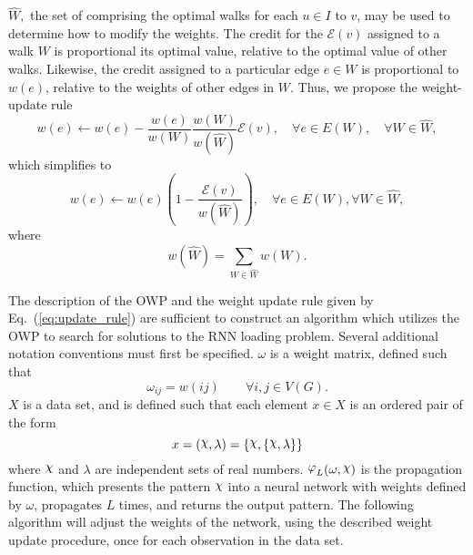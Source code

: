 \documentclass[journal]{IEEEtran}
\DeclareRobustCommand{\rchi}{{\mathpalette\irchi\relax}}
\newcommand{\irchi}[2]{\raisebox{\depth}{$#1\chi$}}
\DeclareRobustCommand{\rvarphi}{{\mathpalette\irvarphi\relax}}
\newcommand{\irvarphi}[2]{\raisebox{\depth}{$#1\varphi$}}
\begin{document}
$\hat{W},$ the set of comprising the optimal walks for each $u\in I$ to $v$, may be used to determine how to modify the weights. The credit for the $\mathcal{E}(v)$ assigned to a walk $W$ is proportional its optimal value, relative to the optimal value of other walks. Likewise, the credit assigned to a particular edge $e\in W$ is proportional to $w(e)$, relative to the weights of other edges in $W.$  Thus, we propose the weight-update rule
\begin{equation*}
w(e) \gets w(e) - \frac{w(e)}{w(W)}\frac{w(W)}{w(\hat{W})}\mathcal{E}(v), \quad \forall e\in E(W), \quad \forall W \in \hat{W},
\end{equation*}
\noindent which simplifies to 
\begin{equation}
w(e) \gets w(e) \left(1 - \frac{\mathcal{E}(v)}{w(\hat{W})}\right), \quad \forall e\in E(W), \forall W \in \hat{W},
\label{eq:update_rule}
\end{equation}
where
\begin{equation}
w(\hat{W}) = \sum_{W\in \hat{W}}w(W).
\label{eq:walk_set_value}
\end{equation}


The description of the OWP and the weight update rule given by Eq.~(\ref{eq:update_rule}) are sufficient to construct an algorithm which utilizes the OWP to search for solutions to the RNN loading problem. Several additional notation conventions must first be specified. $\omega$ is a weight matrix, defined such that
\begin{equation}
\omega_{ij}=w({ij}) \quad\quad \forall i,j \in V(G)\label{eq:weight_matrix}.
\end{equation}
\noindent $X$ is a data set, and is defined such that each element $x\in X$ is an ordered pair of the form 
\begin{equation*} \label{eq:data_ordered_pairs}
x=(\rchi, \lambda)=\{\rchi, \{ \rchi, \lambda \}\}
\end{equation*}
\noindent where $\rchi$ and $\lambda$ are independent sets of real numbers. $\rvarphi_L(\omega, \rchi)$ is the propagation function, which presents the pattern $\rchi$ into a neural network with weights defined by $\omega$, propagates $L$ times, and returns the output pattern. The following algorithm will adjust the weights of the network, using the described weight update procedure, once for each observation in the data set.
\end{document}
